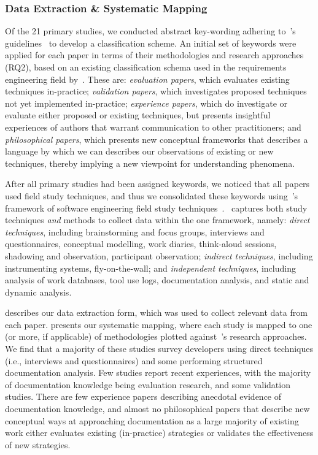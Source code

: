 \subsubsection{Data Extraction \& Systematic Mapping}
\label{tse2020:sec:data-extraction}

Of the 21 primary studies, we conducted abstract key-wording adhering to~\citeauthor{Petersen:2008td}'s guidelines~\citep{Petersen:2008td} to develop a classification scheme.
An initial set of keywords were applied for each paper in terms of their methodologies and research approaches (RQ2), based on an existing classification schema used in the requirements engineering field by~\citet{Wieringa:2006vd}. These are: \textit{evaluation papers}, which evaluates existing techniques in-practice; \textit{validation papers}, which investigates proposed techniques not yet implemented in-practice; \textit{experience papers}, which do investigate or evaluate either proposed or existing techniques, but presents insightful experiences of authors that warrant communication to other practitioners; and \textit{philosophical papers}, which presents new conceptual frameworks that describes a language by which we can describes our observations of existing or new techniques, thereby implying a new viewpoint for understanding phenomena.

After all primary studies had been assigned keywords, we noticed that all papers used field study techniques, and thus we consolidated these keywords using~\citeauthor{Singer:2007tu}'s framework of software engineering field study techniques~\citep{Singer:2007tu}.~\citeauthor{Singer:2007tu} captures both study techniques \textit{and} methods to collect data within the one framework, namely: \textit{direct techniques}, including brainstorming and focus groups, interviews and questionnaires, conceptual modelling, work diaries, think-aloud sessions, shadowing and observation, participant observation; \textit{indirect techniques}, including instrumenting systems, fly-on-the-wall; and \textit{independent techniques}, including analysis of work databases, tool use logs, documentation analysis, and static and dynamic analysis. 

 describes our data extraction form, which was used to collect relevant data from each paper.  presents our systematic mapping, where each study is mapped to one (or more, if applicable) of methodologies plotted against~\citeauthor{Wieringa:2006vd}'s research approaches. We find that a majority of these studies survey developers using direct techniques (i.e., interviews and questionnaires) and some performing structured documentation analysis. Few studies report recent experiences, with the majority of  documentation knowledge being evaluation research, and some validation studies. There are few experience papers describing anecdotal evidence of  documentation knowledge, and almost no philosophical papers that describe new conceptual ways at approaching  documentation as a large majority of existing work either evaluates existing (in-practice) strategies or validates the effectiveness of new strategies.

